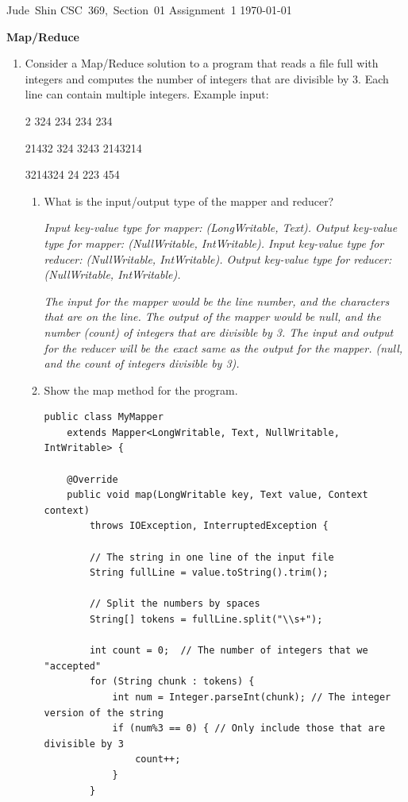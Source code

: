 \documentclass[11pt]{article}
\begin{document}
\hfill\vbox{\hbox{Jude Shin}
		\hbox{CSC 369, Section 01}	
		\hbox{Assignment 1}	
		\hbox{\today}}\par

\bigskip
\centerline{\Large\bf Map/Reduce}\par
\bigskip

\begin{enumerate}
	\item Consider a Map/Reduce solution to a program that reads a file full with 
		integers and computes the number of integers that are divisible by 3. Each 
		line can contain multiple integers. Example input:

		2 324 234 234 234 

		21432 324 3243 2143214

		3214324 24 223 454


		\begin{enumerate}
			\item What is the input/output type of the mapper and reducer?

				\textit{Input key-value type for mapper: (LongWritable, Text). 
				Output key-value type for mapper: (NullWritable, IntWritable). 
				Input key-value type for reducer: (NullWritable, IntWritable). 
				Output key-value type for reducer: (NullWritable, IntWritable).}
				
				\textit{The input for the mapper would be the line number, and the 
				characters that are on the line. The output of the mapper would be 
				null, and the number (count) of integers that are divisible by 3.
				The input and output for the reducer will be the exact same as the 
				output for the mapper. (null, and the count of integers divisible by 
				3).}

			\item Show the map method for the program.
				
\begin{lstlisting}
public class MyMapper 
	extends Mapper<LongWritable, Text, NullWritable, IntWritable> {

	@Override
	public void map(LongWritable key, Text value, Context context) 
		throws IOException, InterruptedException {

		// The string in one line of the input file
		String fullLine = value.toString().trim();

		// Split the numbers by spaces
		String[] tokens = fullLine.split("\\s+");

		int count = 0;	// The number of integers that we "accepted"
		for (String chunk : tokens) {
			int num = Integer.parseInt(chunk); // The integer version of the string
			if (num%3 == 0) { // Only include those that are divisible by 3
				count++;
			}
		}
		

\end{lstlisting}
\end{enumerate}
\end{enumerate}
\end{document}
